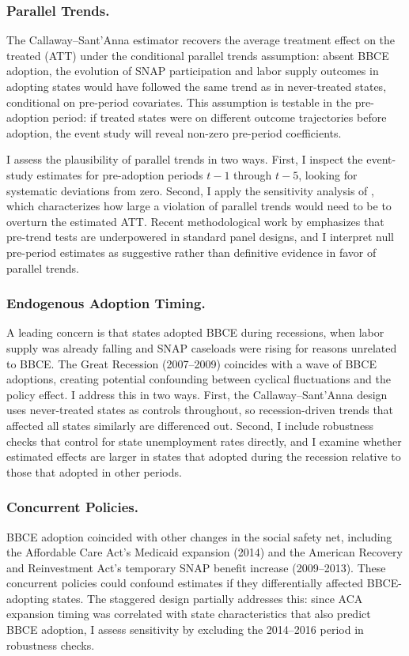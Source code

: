 \documentclass[12pt]{article}
\begin{document}
\subsubsection*{Parallel Trends.} The Callaway--Sant'Anna estimator recovers the average treatment effect on the treated (ATT) under the conditional parallel trends assumption: absent BBCE adoption, the evolution of SNAP participation and labor supply outcomes in adopting states would have followed the same trend as in never-treated states, conditional on pre-period covariates. This assumption is testable in the pre-adoption period: if treated states were on different outcome trajectories before adoption, the event study will reveal non-zero pre-period coefficients.

I assess the plausibility of parallel trends in two ways. First, I inspect the event-study estimates for pre-adoption periods $t-1$ through $t-5$, looking for systematic deviations from zero. Second, I apply the sensitivity analysis of \citet{rambachan2023more}, which characterizes how large a violation of parallel trends would need to be to overturn the estimated ATT. Recent methodological work by \citet{roth2023pretrends} emphasizes that pre-trend tests are underpowered in standard panel designs, and I interpret null pre-period estimates as suggestive rather than definitive evidence in favor of parallel trends.

\subsubsection*{Endogenous Adoption Timing.} A leading concern is that states adopted BBCE during recessions, when labor supply was already falling and SNAP caseloads were rising for reasons unrelated to BBCE. The Great Recession (2007--2009) coincides with a wave of BBCE adoptions, creating potential confounding between cyclical fluctuations and the policy effect. I address this in two ways. First, the Callaway--Sant'Anna design uses never-treated states as controls throughout, so recession-driven trends that affected all states similarly are differenced out. Second, I include robustness checks that control for state unemployment rates directly, and I examine whether estimated effects are larger in states that adopted during the recession relative to those that adopted in other periods.

\subsubsection*{Concurrent Policies.} BBCE adoption coincided with other changes in the social safety net, including the Affordable Care Act's Medicaid expansion (2014) and the American Recovery and Reinvestment Act's temporary SNAP benefit increase (2009--2013). These concurrent policies could confound estimates if they differentially affected BBCE-adopting states. The staggered design partially addresses this: since ACA expansion timing was correlated with state characteristics that also predict BBCE adoption, I assess sensitivity by excluding the 2014--2016 period in robustness checks.
\end{document}
